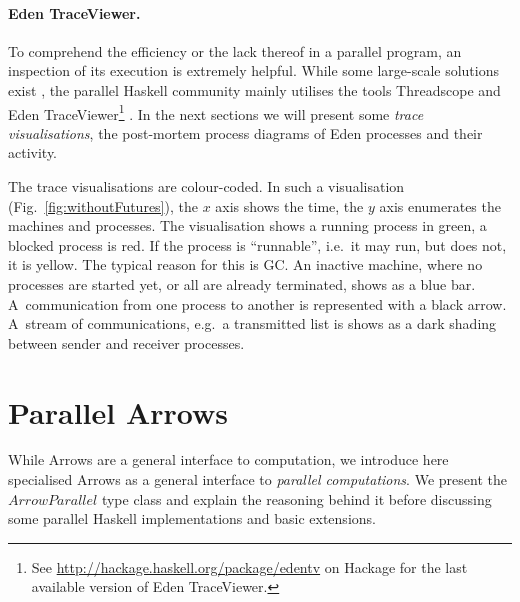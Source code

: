 \documentclass{jfp1}
\newcommand{\Conid}[1]{\mathit{#1}}
\renewcommand{\cite}[1]{\citep{#1}}
\DeclareRobustCommand{\hairspn}{\hspace{1pt}\nolinebreak}%
\DeclareRobustCommand{\ie}{{i.\hairspn{}e.~}}
\DeclareRobustCommand{\eg}{{e.\hairspn{}g.~}}
\begin{document}
\paragraph{Eden TraceViewer.}
\label{sec:edentv}
To comprehend the efficiency or the lack thereof in a parallel program, an inspection of its execution is extremely helpful. While some large-scale solutions exist \cite{Geimer2010}, the parallel Haskell community mainly utilises the tools Threadscope \cite{Wheeler2009} and Eden TraceViewer\footnote{See \url{http://hackage.haskell.org/package/edentv} on Hackage for the last available version of Eden TraceViewer.} \cite{Berthold2007a}. In the next sections we will present some \emph{trace visualisations}, the post-mortem process diagrams of Eden processes and their activity.

The trace visualisations are colour-coded. In such a visualisation (Fig.~\ref{fig:withoutFutures}), the $x$ axis shows the time, the $y$ axis enumerates the machines and processes. The visualisation shows a running process in green, a blocked process is red. If the process is \enquote{runnable}, \ie it may run, but does not, it is yellow. The typical reason for this is GC. An inactive machine, where no processes are started yet, or all are already terminated, shows as a blue bar. A~communication from one process to another is represented with a black arrow. A~stream of communications, \eg a transmitted list is shows as a dark shading between sender and receiver processes.


	\section{Parallel Arrows}
\label{sec:parallel-arrows}
While Arrows are a general interface to computation, we introduce here specialised Arrows as a general interface to \textit{parallel computations}. We present the \ensuremath{\Conid{ArrowParallel}} type class and explain the reasoning behind it before discussing some parallel Haskell implementations and basic extensions.
\end{document}
